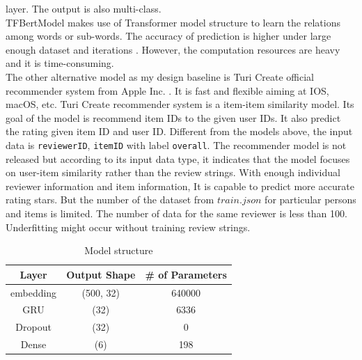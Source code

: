 \documentclass[12pt]{article}
\begin{document}
layer. The output is also multi-class.\\
TFBertModel makes use of Transformer model structure to learn the relations among words or sub-words.
The accuracy of prediction is higher under large enough dataset and iterations \cite{BERTpros}. 
However, the computation resources are heavy and it is time-consuming.\\
The other alternative model as my design baseline is Turi Create official recommender system from Apple Inc. \cite{graph}.
It is fast and flexible aiming at IOS, macOS, etc. Turi Create recommender system is a item-item similarity model.
Its goal of the model is recommend item IDs to the given user IDs. It also predict the rating given item ID and user ID.
Different from the models above, 
the input data is \texttt{reviewerID}, \texttt{itemID} with label \texttt{overall}. The recommender model is not
released but according to its input data type, it indicates
that the model focuses on user-item similarity rather than the review strings. 
With enough individual reviewer information and item information, It is capable to predict more accurate rating
stars. But the number of the dataset from $train.json$ for particular persons and items is limited. The number of
data for 
the same reviewer is less than 100. Underfitting might occur
without training review strings.
\begin{table}[h!]
    \centering
        \begin{tabular}{|c|c|c|}
        \hline
        Layer & Output Shape & \# of Parameters \\
        \hline 
        embedding & (500, 32) & 640000 \\
        \hline
        GRU &                   (32) &               6336 \\
        \hline
        Dropout &                   (32) &               0 \\
        \hline
        Dense  &               (6)     &            198  \\
        \hline
        \end{tabular}
    \caption{Model structure}
    \label{table:ms}
\end{table}
\end{document}

